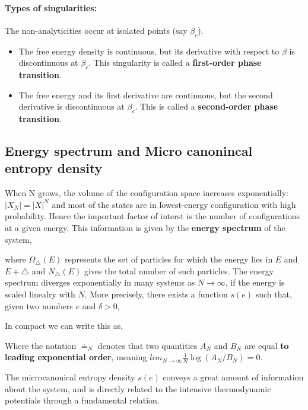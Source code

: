 \documentclass[letterpaper,english,12pt]{article}
\begin{document}
\paragraph{Types of singularities:}
The non-analyticities occur at isolated points (say $\beta_c$).
\begin{itemize}
\item
	The free energy density is continuous, but its derivative with respect to $\beta$ is discontinuous at $\beta_c$. This singularity is called a \textbf{first-order phase transition}.
\item
	The free energy and its first derivative are continuous, but the second derivative is discontinuous at $\beta_c$. This is called a \textbf{second-order phase transition}.
\end{itemize}

\subsection{Energy spectrum and Micro canonincal entropy density}
When N grows, the volume of the configuration space increases exponentially:$|X_N| = |X|^N$ and most of the states are in lowest-energy configuration with high probability. Hence the important factor of interst is the number of configurations at a given energy. This information is given by the \textbf{energy spectrum} of the system,

where $\Omega_\triangle (E)$ represents the set of particles for which the energy lies in $E$ and $E+\triangle$ and $N_\triangle (E)$ gives the total number of such particles.
The energy spectrum diverges exponentially in many systems as $N \rightarrow \infty$, if the energy is scaled linealry with $N$. More precisely, there exists a function $s(e)$ such that, given two numbers $e$ and $\delta > 0$,

In compact we can write this as,

Where the notation $\stackrel{.}{=}_N$ denotes that two quantities $A_N$ and $B_N$ are equal \textbf{to leading exponential order}, meaning $lim_{N \rightarrow \infty} \frac{1}{N} \log (A_N/B_N)=0$.

The microcanonical entropy density $s(e)$ conveys a great amount of information about the system, and is directly related to the intensive thermodynamic
potentials through a fundamental relation.
\end{document}

